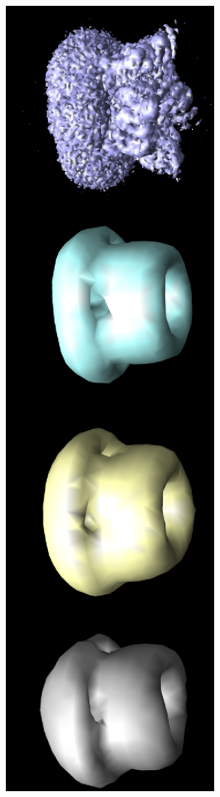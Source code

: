 \documentclass[12pt]{article}
\newcommand{\1}{\mathbf{1}}
\theoremstyle{plain}
\theoremstyle{definition}
\theoremstyle{remark}
\theoremstyle{plain}
\theoremstyle{remark}
\theoremstyle{plain}
\theoremstyle{plain}
\begin{document}
\begin{figure}[h]
	\centering
	\begin{subfigure}[h]{0.45\textwidth}
		\centering
		\includegraphics[angle=270, width=1\textwidth]{TRPV1_rec_incl_noisy_resize.eps}

\end{subfigure}
\end{figure}
\end{document}

